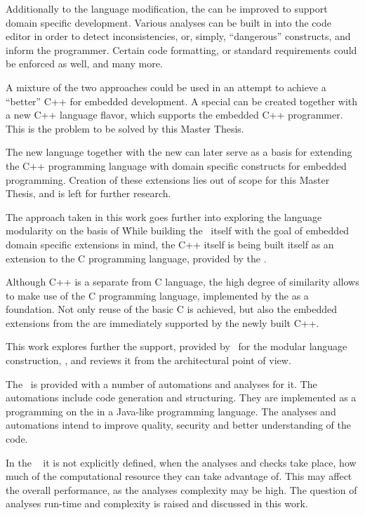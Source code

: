 Additionally to the language modification, the  can 
be improved to support domain specific development. Various analyses can be built in into the code 
editor in order to detect inconsistencies, or, simply, ``dangerous'' constructs, and inform the programmer.
Certain code formatting, or standard requirements could be enforced as well, and many more.

A mixture of the two approaches could be used in an attempt to achieve a ``better'' C++ for embedded development.
A special  can be created together with a new C++ language flavor, which supports the embedded C++ programmer.
This is the problem to be solved by this Master Thesis.

The new language together with the new  can later serve as a basis for extending the C++ programming 
language with domain specific constructs for embedded programming. Creation of these extensions lies out of scope
for this Master Thesis, and is left for further research.

The approach taken in this work goes further into exploring the language modularity on the basis of \jbmps\. While building the \cpppl\ itself 
with the goal of embedded domain specific extensions in mind, the C++ itself is being built itself as an extension to the C programming language,
provided by the .

Although C++ is a separate from C language, the high degree of similarity allows to make use of the C programming language,
implemented by the  as a foundation. Not only reuse of the basic C is achieved, but also the embedded extensions from
the  are immediately supported by the newly built C++.

This work explores further the support, provided by \jbmps\ for the modular language construction, \cite{2012_ratiu_modular_dsls_and_analyses},
and reviews it from the architectural point of view.

The \cpppl\ is provided with a number of automations and analyses for it. The automations include code generation and structuring.
They are implemented as a programming on the  in a Java-like programming language. 
The analyses and automations intend to improve quality, security and better understanding of the code.

In the \jbmps\  it is not explicitly defined, when the analyses and checks take place, how much of 
the computational resource they can take advantage of. This may affect the overall  performance, 
as the analyses complexity may be high. The question of analyses run-time and complexity is raised and discussed in this work.